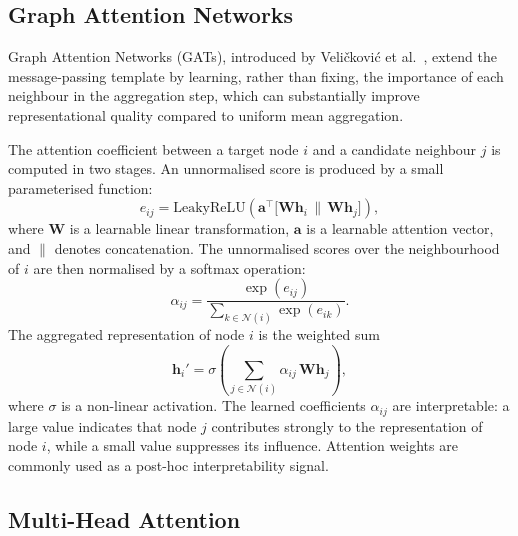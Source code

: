 \documentclass[%
    BCOR=10mm,
    DIV=13,
    toc=bibliography,
    toc=listof,
    oneside,
    12pt,
]{scrbook}
\begin{document}
\subsection{Graph Attention Networks}
\label{subsec:gat}

Graph Attention Networks (GATs), introduced by Veli\v{c}kovi\'{c} et
al.~\cite{velickovic2018gat}, extend the message-passing template by
learning, rather than fixing, the importance of each neighbour in the
aggregation step, which can substantially improve representational quality
compared to uniform mean aggregation.

The attention coefficient between a target node $i$ and a candidate neighbour
$j$ is computed in two stages. An unnormalised score is produced by a small
parameterised function:
\begin{equation}
  e_{ij} = \mathrm{LeakyReLU}\!\left(
    \mathbf{a}^\top \bigl[ \mathbf{W} \mathbf{h}_i \,\|\, \mathbf{W} \mathbf{h}_j \bigr]
  \right),
  \label{eq:gat_score}
\end{equation}
where $\mathbf{W}$ is a learnable linear transformation, $\mathbf{a}$ is a
learnable attention vector, and $\|$ denotes concatenation. The unnormalised
scores over the neighbourhood of $i$ are then normalised by a softmax
operation:
\begin{equation}
  \alpha_{ij} = \frac{\exp(e_{ij})}{\sum_{k \in \mathcal{N}(i)} \exp(e_{ik})}.
  \label{eq:gat_alpha}
\end{equation}
The aggregated representation of node $i$ is the weighted sum
\begin{equation}
  \mathbf{h}_i' = \sigma\!\left(
    \sum_{j \in \mathcal{N}(i)} \alpha_{ij}\, \mathbf{W} \mathbf{h}_j
  \right),
  \label{eq:gat_agg}
\end{equation}
where $\sigma$ is a non-linear activation. The learned coefficients
$\alpha_{ij}$ are interpretable: a large value indicates that node $j$
contributes strongly to the representation of node $i$, while a small value
suppresses its influence. Attention weights are commonly used as a post-hoc
interpretability signal.

\subsection{Multi-Head Attention}
\label{subsec:multihead}
\end{document}
